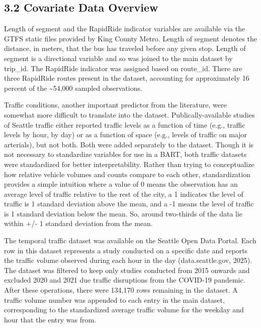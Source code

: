 \documentclass[
  12pt,
]{article}
\begin{document}
\subsection{3.2 Covariate Data Overview}\label{covariate-data-overview}

Length of segment and the RapidRide indicator variables are available
via the GTFS static files provided by King County Metro. Length of
segment denotes the distance, in meters, that the bus has traveled
before any given stop. Length of segment is a directional variable and
so was joined to the main dataset by trip\_id. The RapidRide indicator
was assigned based on route\_id. There are three RapidRide routes
present in the dataset, accounting for approximately 16 percent of the
\textasciitilde54,000 sampled observations.

Traffic conditions, another important predictor from the literature,
were somewhat more difficult to translate into the dataset.
Publically-available studies of Seattle traffic either reported traffic
levels as a function of time (e.g., traffic levels by hour, by day) or
as a function of space (e.g., levels of traffic on major arterials), but
not both. Both were added separately to the dataset. Though it is not
necessary to standardize variables for use in a BART, both traffic
datasets were standardized for better interpretability. Rather than
trying to conceptualize how relative vehicle volumes and counts compare
to each other, standardization provides a simple intuition where a value
of 0 means the observation has an average level of traffic relative to
the rest of the city, a 1 indicates the level of traffic is 1 standard
deviation above the mean, and a -1 means the level of traffic is 1
standard deviation below the mean. So, around two-thirds of the data lie
within +/- 1 standard deviation from the mean.

The temporal traffic dataset was available on the Seattle Open Data
Portal. Each row in this dataset represents a study conducted on a
specific date and reports the traffic volume observed during each hour
in the day (data.seattle.gov, 2025). The dataset was filtered to keep
only studies conducted from 2015 onwards and excluded 2020 and 2021 due
traffic disruptions from the COVID-19 pandemic. After these operations,
there were 134,170 rows remaining in the dataset. A traffic volume
number was appended to each entry in the main dataset, corresponding to
the standardized average traffic volume for the weekday and hour that
the entry was from.
\end{document}
